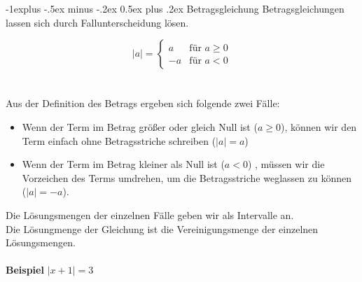 \documentclass[10pt,landscape]{article}
\makeatletter
\renewcommand{\subsection}{\@startsection{subsection}{2}{0mm}%
                                {-1explus -.5ex minus -.2ex}%
                                {0.5ex plus .2ex}%
                                {\normalfont\normalsize\bfseries}}
\makeatother
\begin{document}
\begin{multicols}{3}
    \subsection{Betragsgleichung}
    Betragsgleichungen lassen sich durch Fallunterscheidung lösen.

    \begin{equation*} |a| = \begin{cases} a &\text{für } a \geq 0 \\[5px] -a &\text{für } a < 0 \end{cases} \end{equation*}\\~\\
    Aus der Definition des Betrags ergeben sich folgende zwei Fälle: \\
    \begin{itemize}
        \item Wenn der Term im Betrag größer oder gleich Null ist ($a \geq 0$), können wir den Term einfach ohne Betragsstriche schreiben ($|a| = a$)
        \item Wenn der Term im Betrag kleiner als Null ist ($a < 0$) , müssen wir die Vorzeichen des Terms umdrehen, um die Betragsstriche weglassen zu können ($|a| = -a$).
    \end{itemize}
    Die Lösungsmengen der einzelnen Fälle geben wir als Intervalle an. \\
    Die Lösungmenge der Gleichung ist die Vereinigungsmenge der einzelnen Lösungsmengen.\\~\\
    \textbf{Beispiel} $|x + 1| = 3$\\~\\


\end{multicols}
\end{document}
